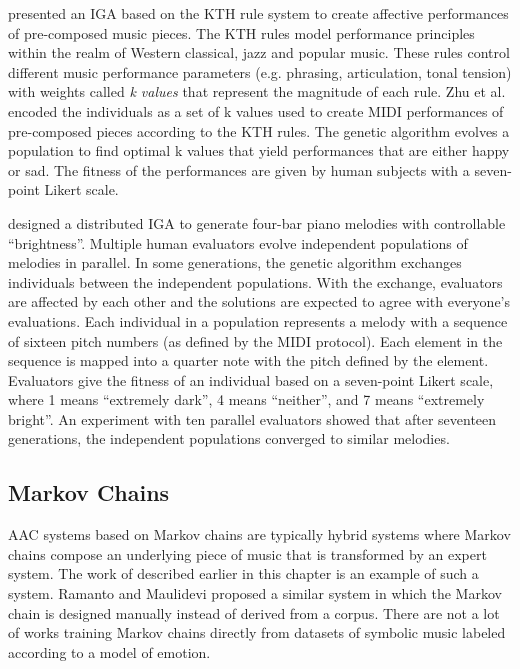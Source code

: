 \citet{zhu2008emotional} presented an IGA based on the KTH rule system \cite{friberg2006overview} to create affective performances of pre-composed music pieces. The KTH rules model performance principles within the realm of Western classical, jazz and popular music. These rules control different music performance parameters (e.g. phrasing, articulation, tonal tension) with weights called \textit{k values} that represent the magnitude of each rule. Zhu et al. \cite{zhu2008emotional} encoded the individuals as a set of k values used to create MIDI performances of pre-composed pieces according to the KTH rules. The genetic algorithm evolves a population to find optimal k values that yield performances that are either happy or sad. The fitness of the performances are given by human subjects with a seven-point Likert scale.

\citet{nomura2018music} designed a distributed IGA to generate four-bar piano melodies with controllable ``brightness''. Multiple human evaluators evolve independent populations of melodies in parallel. In some generations, the genetic algorithm exchanges individuals between the independent populations. With the exchange, evaluators are affected by each other and the solutions are expected to agree with everyone's evaluations. Each individual in a population represents a melody with a sequence of sixteen pitch numbers (as defined by the MIDI protocol). Each element in the sequence is mapped into a quarter note with the pitch defined by the element. Evaluators give the fitness of an individual based on a seven-point Likert scale, where 1 means ``extremely dark'', 4 means ``neither'', and 7 means ``extremely bright''. An experiment with ten parallel evaluators showed that after seventeen generations, the independent populations converged to similar melodies.

\subsection{Markov Chains}

AAC systems based on Markov chains are typically hybrid systems where Markov chains compose an underlying piece of music that is transformed by an expert system. The work of \citet{williams2015dynamic} described earlier in this chapter is an example of such a system. Ramanto and Maulidevi \cite{ramanto2017markov} proposed a similar system in which the Markov chain is designed manually instead of derived from a corpus. There are not a lot of works training Markov chains directly from datasets of symbolic music labeled according to a model of emotion.

